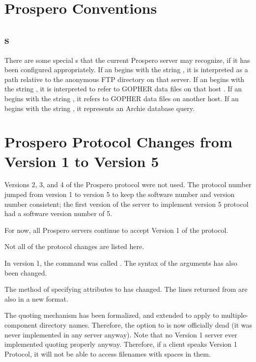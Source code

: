\chapter{Prospero Conventions\label{conventions}}

\section{\protect{}s}

There are some special s that the current Prospero
server may recognize, if it has been configured appropriately.  If an
 begins with the string , it is interpreted
as a path relative to the anonymous FTP directory on that server.  If
an  begins with the string
\zoos\lit{(}\lit{)}\zooe, it is
interpreted to refer to GOPHER data files on that host .  If an
 begins with the string , it refers
to GOPHER data files on another host.  If an 
begins with the string , it represents an Archie database
query.


\chapter{Prospero Protocol Changes from Version 1 to Version 5}

Versions 2, 3, and 4 of the Prospero protocol were not used.  The
protocol number jumped from version 1 to version 5 to keep the
software number and version number consistent; the first version of
the server to implement version 5 protocol had a software version
number of 5.

For now, all Prospero servers continue to accept Version 1 of the
protocol.

Not all of the protocol changes are listed here.

In version 1, the  command was called .
The syntax of the arguments has also been changed.

The method of specifying attributes to  has changed.  The
lines returned from  are also in a new format.

The quoting mechanism has been formalized, and extended to apply to
multiple-component directory names.  Therefore, the 
option to  is now officially dead (it was never implemented
in any server anyway).  Note that no Version 1 server ever implemented
quoting properly anyway.  Therefore, if a client speaks Version 1
Protocol, it will not be able to access filenames with spaces in them.



